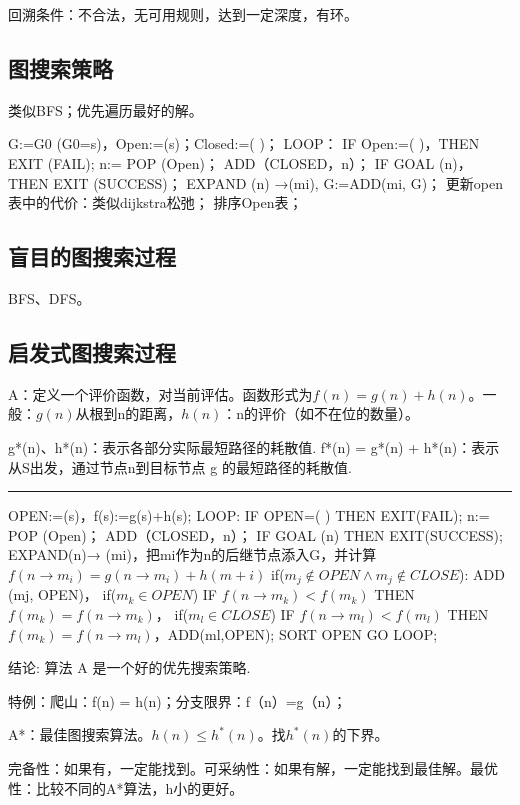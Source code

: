 \documentclass[twocolumn,zihao=5,linespread=1,heading=false,autoindent=0pt]{ctexart}
\newcommand{\HRule}[1][\medskipamount]{\par
  \vspace*{\dimexpr-\parskip-\baselineskip+#1}
  \noindent\rule{\linewidth}{0.2mm}\par
  \vspace*{\dimexpr-\parskip-.5\baselineskip+#1}}
\theoremstyle{exampstyle} \newtheorem{definition}{定义}[section]
\theoremstyle{exampstyle} \newtheorem{example}{例}[section]
\theoremstyle{exampstyle} \newtheorem{theorem}{定理}[section]
\theoremstyle{exampstyle} \newtheorem{lemma}{引理}[section]
\theoremstyle{exampstyle} \newtheorem{myproof}{证明}[section]
\begin{document}
回溯条件：不合法，无可用规则，达到一定深度，有环。
\begin{multicols}{2}
    \subsection{图搜索策略}
类似BFS；优先遍历最好的解。
\begin{outline}[citemize]
    \1 G:=G0 (G0=s)，Open:=(s)；Closed:=( )；
    \1 LOOP：
        \2 IF Open:=( )，THEN EXIT (FAIL);
        \2 n:= POP (Open)； ADD（CLOSED，n）；
        \2 IF GOAL (n)，THEN EXIT (SUCCESS)；
        \2 EXPAND (n) →(mi), G:=ADD(mi, G)；
        \2 更新open表中的代价：类似dijkstra松弛；
        \2 排序Open表；
\end{outline}
\subsection{盲目的图搜索过程}
BFS、DFS。
\subsection{启发式图搜索过程}
A：定义一个评价函数，对当前评估。函数形式为$f(n) = g(n) + h(n)$。一般：$g(n)$从根到n的距离，$h(n)$：n的评价（如不在位的数量）。

g*(n)、h*(n)：表示各部分实际最短路径的耗散值.
f*(n) = g*(n) + h*(n)：表示从S出发，通过节点n到目标节点 g 的最短路径的耗散值.
\end{multicols}

\HRule

\begin{outline}[citemize]
    \1 OPEN:=(s)，f(s):=g(s)+h(s); 
    \1 LOOP: IF OPEN=( ) THEN EXIT(FAIL); 
    \1 n:= POP (Open)； ADD（CLOSED，n）；
    \1 IF GOAL (n)  THEN EXIT(SUCCESS); 
    \1 EXPAND(n)→ (mi)，把mi作为n的后继节点添入G，并计算$f(n \to m_i) = g(n \to m_i) + h(m+i)$
        \2 if($m_j \notin OPEN \land m_j \notin CLOSE$): ADD (mj, OPEN)， 
        \2 if($m_k\in OPEN$) IF $f(n \to m_k) < f(m_k)$  THEN $f(m_k) = f(n \to m_k)$， 
        \2 if($m_l\in CLOSE$) IF $f(n \to m_l) < f(m_l)$  THEN $f(m_k) = f(n \to m_l)$，ADD(ml,OPEN); 
    \1 SORT OPEN
    \1 GO LOOP; 
\end{outline}

结论: 算法 A 是一个好的优先搜索策略. 

特例：爬山：f(n) = h(n)；分支限界：f（n）=g（n）；

A*：最佳图搜索算法。$h(n) \le h^*(n)$。找$h^*(n)$的下界。

完备性：如果有，一定能找到。可采纳性：如果有解，一定能找到最佳解。最优性：比较不同的A*算法，h小的更好。
\end{document}
